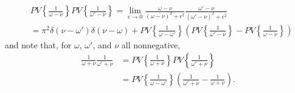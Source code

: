 \begin{equation}
\begin{split}
&PV\left\{\frac{1}{\omega - \nu}\right\}PV\left\{\frac{1}{\omega' - \nu}\right\} = \lim_{\epsilon\to0}\frac{\omega - \nu}{(\omega - \nu)^2 + \epsilon^2}\frac{\omega' - \nu}{(\omega' - \nu)^2 + \epsilon^2}\\
&= \pi^2\delta(\nu - \omega')\delta(\nu - \omega) + PV\left\{\frac{1}{\omega - \omega'}\right\}\left(PV\left\{\frac{1}{\omega' - \nu}\right\} - PV\left\{\frac{1}{\omega - \nu}\right\}\right)
\end{split}
\end{equation}
and note that, for $\omega$, $\omega'$, and $\nu$ all nonnegative,
\begin{equation}
\begin{split}
\frac{1}{\omega + \nu}\frac{1}{\omega' + \nu} &= PV\left\{\frac{1}{\omega + \nu}\right\}PV\left\{\frac{1}{\omega' + \nu}\right\}\\
&= PV\left\{\frac{1}{\omega - \omega'}\right\}\left(\frac{1}{\omega' + \nu} - \frac{1}{\omega + \nu}\right).
\end{split}
\end{equation} 
